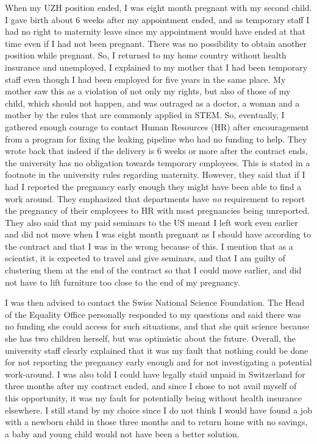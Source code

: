 \documentclass[utf8]{frontiersSCNS} %
\begin{document}
When my UZH position ended, I was eight month pregnant with my second child. I gave birth about 6 weeks after my appointment ended, and as temporary staff I had no right to maternity leave since my appointment would have ended at that time even if I had not been pregnant. There was no possibility to obtain another position while pregnant. So, I returned to my home country without health insurance and unemployed, I explained to my mother that I had been temporary staff even though I had been employed for five years in the same place. My mother saw this as a violation of not only my rights, but also of those of my child, which should not happen, and was outraged as a doctor, a woman and a mother by the rules that are commonly applied in STEM.  So, eventually, I gathered enough courage to contact Human Resources (HR) after encouragement from a program for fixing the leaking pipeline who had no funding to help. They wrote back that indeed if the delivery is 6 weeks or more after the contract ends, the university has no obligation towards temporary employees. This is stated in a footnote in the university rules regarding maternity. However, they said that if I had I reported the pregnancy early enough they might have been able to find a work around. They emphasized that departments have {\it no} requirement to report the pregnancy of their employees to HR with most pregnancies being unreported. They also said that my paid seminars to the US meant I left work even earlier and did not move when I was eight month pregnant as I should have according to the contract and that I was in the wrong because of this. I mention that as a scientist, it is expected to travel and give seminars, and that I am guilty of clustering them at the end of the contract so that I could move earlier, and did not have to lift furniture too close to the end of my pregnancy. 

I was then advised to contact the Swiss National Science Foundation. The Head of the Equality Office personally responded to my questions and said there was no funding she could access for such situations, and that she quit science because she has two children herself, but was optimistic about the future. Overall, the university staff clearly explained that it was my fault that nothing could be done for not reporting the pregnancy early enough and for not investigating a potential work-around. I was also told I could have legally staid unpaid in Switzerland for three months after my contract ended, and since I chose to not avail myself of this opportunity, it was my fault for potentially being without health insurance elsewhere. I still stand by my choice since I do not think I would have found a job with a newborn child in those three months and to return home with no savings, a baby and young child would not have been a better solution.%
\end{document}
